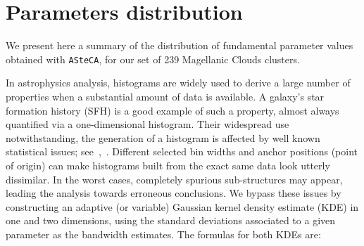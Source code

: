 \documentclass{aa}
\begin{document}

\section{Parameters distribution}
\label{sec:param-dist}

We present here a summary of the distribution of fundamental parameter values
obtained with \texttt{ASteCA}, for our set of 239 Magellanic Clouds clusters.
%


In astrophysics analysis, histograms are widely used to derive a large number of
properties when a substantial amount of data is available. A galaxy's star
formation history (SFH) is a good example of such a property, almost always
quantified via a one-dimensional histogram.
%
Their widespread use notwithstanding, the generation of a histogram is affected
by well known statistical issues;
see~\cite{Silverman_1986},~\cite{Simonoff_1997}. Different selected bin widths
and anchor positions (point of origin) can make histograms built
from the exact same data look utterly dissimilar. In the worst cases, completely
spurious sub-structures may appear, leading the analysis towards erroneous
conclusions.
%
We bypass these issues by constructing an adaptive (or variable) Gaussian kernel
density estimate (KDE) in one and two dimensions, using the standard deviations
associated to a given parameter as the bandwidth estimates. The formulas for
both KDEs are:
\end{document}
